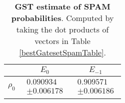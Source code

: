 \documentclass{article}[11pt]
\begin{document}
\begin{table}[h]
\begin{center}
\begin{tabular}[l]{|c|c|c|}
\hline
 & $E_{0}$ & $E_{-1}$ \\ \hline
$\rho_{0}$ & $ \begin{array}{c} 0.090934 \\ \pm 0.006178 \end{array} $ & $ \begin{array}{c} 0.909571 \\ \pm 0.006186 \end{array} $ \\ \hline
\end{tabular}

\caption{\textbf{GST estimate of SPAM probabilities}.  Computed by taking the dot products of vectors in Table \ref{bestGatesetSpamTable}.\label{bestGatesetSpamParametersTable}}
\end{center}
\end{table}
\end{document}
